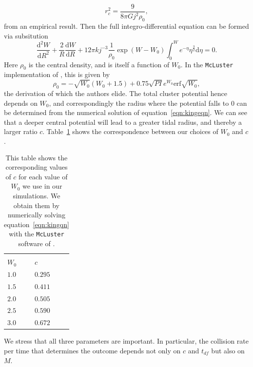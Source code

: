 \documentclass{princeton_astro_thesis}
\numberwithin{equation}{section}
\begin{document}
\begin{equation}
r_{c}^{2} = \frac{9}{8 \pi G j^2 \rho_0},
\end{equation}
from an empirical result. Then the full integro-differential equation can be formed via subsitution
\begin{equation}
\frac{\mathrm{d}^2W}{\mathrm{d}R^2} + \frac{2}{R}\frac{\mathrm{d}W}{\mathrm{d}R} + 12 \pi k j^{-3} \frac{1}{\rho_{0}} \exp(W-W_{0}) \int_{0}^{W} e^{-\eta} \eta^\frac{3}{2} \mathrm{d}\eta = 0.
\label{eqn:kingeqn}
\end{equation}
Here $\rho_{0}$ is the central density, and is itself a function of $W_{0}$.  In the \texttt{McLuster} implementation of \citet{2011Kupper}, this is given by
\begin{equation}
\rho_{0} = -\sqrt{W_{0}}(W_{0}+1.5) + 0.75\sqrt{PI} e^{W_{0}} \mathrm{erf}{\sqrt{W_{0}}},
\end{equation}
the derivation of which the authors elide. The total cluster potential hence depends on $W_{0}$, and correspondingly the radius where the potential falls to $0$ can be determined from the numerical solution of equation~\ref{eqn:kingeqn}.  We can see that a deeper central potential will lead to a greater tidal radius, and thereby a larger ratio $c$. Table~\ref{tbl:ctable} shows the correspondence between our choices of $W_{0}$ and $c$.

\begin{table}
\begin{center}
\begin{tabular}{l l}
\hline \hline \\
$W_{0}$ & $c$ \\
$1.0$ & $0.295$ \\
$1.5$ & $0.411$ \\
$2.0$ & $0.505$ \\
$2.5$ & $0.590$ \\
$3.0$ & $0.672$
\end{tabular}
\end{center}
\caption{This table shows the corresponding values of $c$ for each value of $W_{0}$ we use in our simulations. We obtain them by numerically solving equation~\ref{eqn:kingqn} with the \texttt{McLuster} software of \citet{2011Kupper}.}
\label{tbl:ctable}
\end{table}

We stress that all three parameters are important. In particular,
the collision rate per time that determines the outcome 
depends not only on $c$ and $t_{df}$ but also on $M$.
\end{document}
